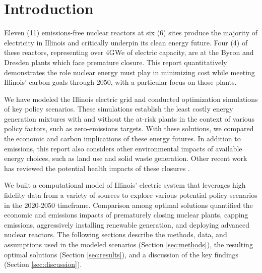 \section{Introduction}\label{sec:intro}
Eleven (11) emissions-free nuclear reactors at six (6) sites produce the majority of
electricity in Illinois and critically underpin its clean energy future. Four 
(4) of these reactors, representing over 4GWe of electric capacity, are at the Byron 
and Dresden plants which face premature closure. This
report quantitatively demonstrates the role nuclear energy must play in
minimizing cost while meeting Illinois’ carbon goals through 2050, with a 
particular focus on those plants. 

We have 
modeled the Illinois electric grid and conducted optimization simulations of 
key policy scenarios. These simulations establish the least costly energy 
generation mixtures with and without the at-risk plants in the context of 
various policy factors, such as zero-emissions targets. 
With these solutions, we compared the economic and carbon implications of these energy futures. 
In addition to emissions, this report also considers
other environmental impacts of available energy choices, such as land use and
solid waste generation. Other recent work has reviewed the potential health 
impacts of these closures \cite{catf_potential_2021}.

We built a computational model of Illinois' electric system that leverages high 
fidelity data from a variety of sources to explore various potential policy 
scenarios in the 2020-2050 timeframe.  Comparison among optimal solutions 
quantified the economic and emissions impacts of prematurely closing nuclear 
plants, capping emissions, aggressively installing renewable generation, and 
deploying advanced nuclear reactors.  The following sections describe the 
methods, data, and assumptions used in the modeled scenarios (Section 
\ref{sec:methods}), the resulting optimal solutions (Section 
\ref{sec:results}), and a discussion of the key findings (Section 
\ref{sec:discussion}).  
